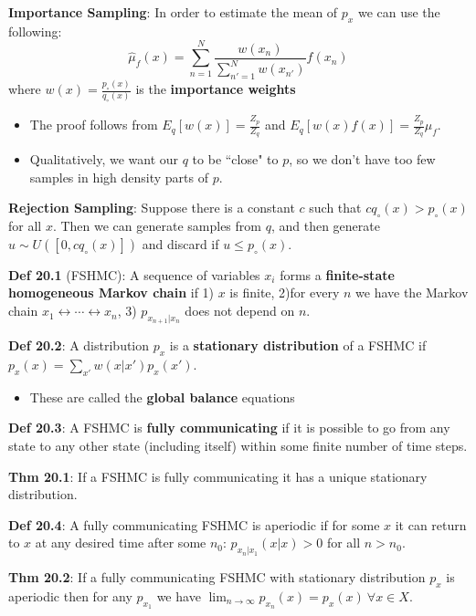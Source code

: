 \documentclass[12pt]{article} %
\begin{document}
\textbf{Importance Sampling}: In order to estimate the mean of $p_x$ we can use the following:
\begin{equation*}
    \hat{\mu}_f(x)
    =
    \sum_{n=1}^N \frac{w(x_n)}{
    \sum_{n'=1}^N w(x_{n'})
    }
    f(x_n)
\end{equation*}
where $w(x) = \frac{p_\circ(x)}{q_\circ(x)}$ is the \textbf{importance weights}
\begin{itemize}[topsep=-1pt, itemsep=-1pt]
    \item The proof follows from $E_q[w(x)] = \frac{Z_p}{Z_q}$ and $E_q[w(x)f(x)] = \frac{Z_p}{Z_q}\mu_f$.
    \item Qualitatively, we want our $q$ to be ``close" to $p$, so we don't have too few samples in high density parts of $p$.
\end{itemize}

\textbf{Rejection Sampling}: Suppose there is a constant $c$ such that $c q_\circ(x) > p_\circ(x)$ for all $x$. Then we can generate samples from $q$, and then generate $u \sim U([0, cq_\circ(x)])$ and discard if $u \leq p_\circ(x)$.

\separate
\textbf{Def 20.1} (FSHMC): A sequence of variables $x_i$ forms a \textbf{finite-state homogeneous Markov chain} if 1) $x$ is finite, 2)for every $n$ we have the Markov chain $x_1 \leftrightarrow \cdots \leftrightarrow x_n$, 3) $p_{x_{n+1}|x_n}$ does not depend on $n$.

\textbf{Def 20.2}: A distribution $p_x$ is a \textbf{stationary distribution} of a FSHMC if $p_x(x) = \sum_{x'} w(x|x') p_x(x')$.
\begin{itemize}[topsep=-1pt, itemsep=-1pt]
    \item These are called the \textbf{global balance} equations
\end{itemize}

\textbf{Def 20.3}: A FSHMC is \textbf{fully communicating} if it is possible to go from any state to any other state (including itself) within some finite number of time steps.


\textbf{Thm 20.1}: If a FSHMC is fully communicating it has a unique stationary distribution.

\textbf{Def 20.4}: A fully communicating FSHMC is aperiodic if for some $x$ it can return to $x$ at any desired time after some $n_0$: $p_{x_n | x_1}(x|x) > 0$ for all $n > n_0$.

\textbf{Thm 20.2}: If a fully communicating FSHMC with stationary distribution $p_x$ is aperiodic then for any $p_{x_1}$ we have $\lim_{n\rightarrow \infty} p_{x_n}(x) = p_x(x) \ \forall x \in X$.
\end{document}
